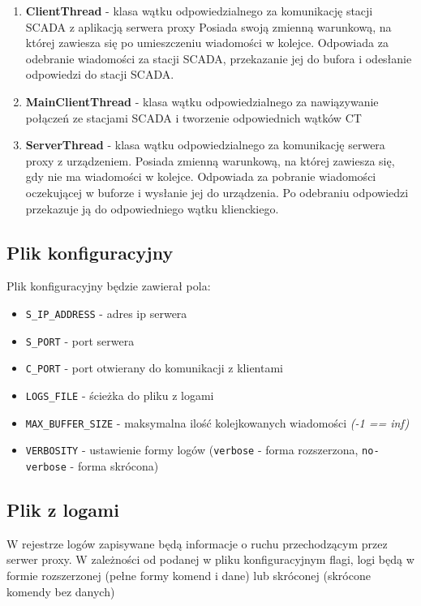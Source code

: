 \documentclass[a4paper]{article}
\begin{document}
\begin{enumerate}
\item \textbf{ClientThread} - klasa wątku odpowiedzialnego za komunikację stacji SCADA z aplikacją serwera proxy
Posiada swoją zmienną warunkową, na której zawiesza się po umieszczeniu wiadomości w kolejce.
Odpowiada za odebranie wiadomości za stacji SCADA, przekazanie jej do bufora i odesłanie odpowiedzi do stacji SCADA.
\item \textbf{MainClientThread} - klasa wątku odpowiedzialnego za nawiązywanie połączeń ze stacjami SCADA i tworzenie odpowiednich wątków CT
\item \textbf{ServerThread} - klasa wątku odpowiedzialnego za komunikację serwera proxy z urządzeniem. Posiada zmienną warunkową, na której zawiesza się, gdy nie ma wiadomości w kolejce.
Odpowiada za pobranie wiadomości oczekującej w buforze i wysłanie jej do urządzenia. Po odebraniu odpowiedzi przekazuje ją do odpowiedniego wątku klienckiego.
\end{enumerate}

\subsection{Plik konfiguracyjny}
Plik konfiguracyjny będzie zawierał pola:
\begin{itemize}
\item \texttt{S\_IP\_ADDRESS} - adres ip serwera
\item \texttt{S\_PORT} - port serwera
\item \texttt{C\_PORT} - port otwierany do komunikacji z klientami
\item \texttt{LOGS\_FILE} - ścieżka do pliku z logami
\item \texttt{MAX\_BUFFER\_SIZE} - maksymalna ilość kolejkowanych wiadomości \textit{(-1 == inf)}
\item \texttt{VERBOSITY} - ustawienie formy logów (\texttt{verbose} - forma rozszerzona, \texttt{no-verbose} - forma skrócona)
\end{itemize}

\subsection{Plik z logami}
W rejestrze logów zapisywane będą informacje o ruchu przechodzącym przez serwer proxy. W zależności od podanej w pliku konfiguracyjnym flagi, logi będą w formie rozszerzonej (pełne formy komend i dane) lub skróconej (skrócone komendy bez danych)\\
\end{document}
